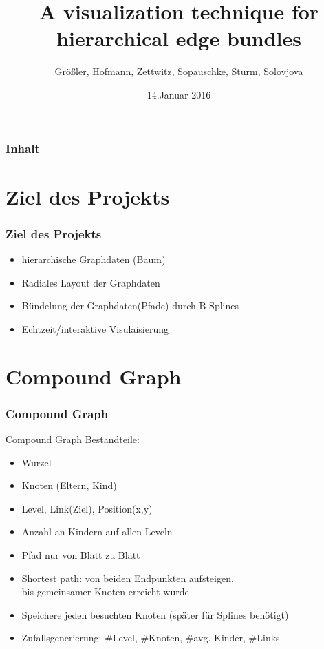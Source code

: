 \documentclass[11pt]{beamer}
\author{Größler, Hofmann, Zettwitz, Sopauschke, Sturm, Solovjova}
\title{A visualization technique for \\  hierarchical edge bundles}
\date{14.Januar 2016}
\begin{document}
\begin{frame}
\titlepage
\end{frame}

\begin{frame}
\frametitle{Inhalt} 
\tableofcontents
\end{frame}


\section{Ziel des Projekts}
\begin{frame}
\frametitle{Ziel des Projekts}
\begin{itemize} 
\item hierarchische Graphdaten (Baum)
\item Radiales Layout der Graphdaten
\item Bündelung der Graphdaten(Pfade) durch B-Splines
\item Echtzeit/interaktive Visulaisierung
\end{itemize}
\end{frame}



\section{Compound Graph}
\begin{frame}[allowframebreaks]
\frametitle{Compound Graph}

Compound Graph Bestandteile:
\begin{itemize} 
\item Wurzel
\item Knoten (Eltern, Kind)                                                                                                                       
\item Level, Link(Ziel), Position(x,y)
\item Anzahl an Kindern auf allen Leveln
\end{itemize}

\framebreak
\begin{itemize} 
\item Pfad nur von Blatt zu Blatt
\item Shortest path: von beiden Endpunkten aufsteigen, \\ bis gemeinsamer Knoten erreicht wurde
\item Speichere jeden besuchten Knoten (später für Splines benötigt)
\item Zufallsgenerierung: \#Level, \#Knoten, \#avg. Kinder, \#Links
\end{itemize}


\end{frame}
\end{document}
